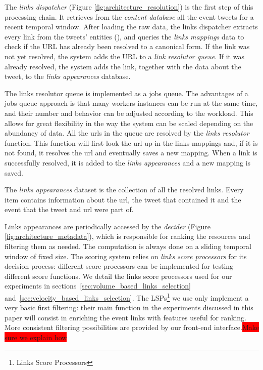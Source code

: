 \documentclass{sig-alternate}
\newcommand{\todo}[1]{\colorbox{red}{#1}}
\begin{document}
The \emph{links dispatcher} (Figure \ref{fig:architecture_resolution}) is the first step of this processing chain. It retrieves from the \emph{content database} all the event tweets for a recent temporal window. After loading the raw data, the links dispatcher extracts every link from the tweets' entities (\cite{RestTweetsDoc}), and queries the \emph{links mappings} data to check if the URL has already been resolved to a canonical form. If the link was not yet resolved, the system adds the URL to a \emph{link resolutor queue}. If it was already resolved, the system adds the link, together with the data about the tweet, to the \emph{links appearances} database. %

The links resolutor queue is implemented as a jobs queue\cite{RedisQueues}. The advantages of a jobs queue approach is that many workers instances can be run at the same time, and their number and behavior can be adjusted according to the workload. This allows for great flexibility in the way the system can be scaled depending on the abundancy of data.
All the urls in the queue are resolved by the \emph{links resolutor} function. This function will first look the url up in the links mappings and, if it is not found, it resolves the url and eventually saves a new mapping. When a link is successfully resolved, it is added to the \emph{links appearances} and a new mapping is saved.

The \emph{links appearances} dataset is the collection of all the resolved links. Every item contains information about the url, the tweet that contained it and the event that the tweet and url were part of. %

Links appearances are periodically accessed by the \emph{decider} (Figure \ref{fig:architecture_metadata}), which is responsible for ranking the resources and filtering them as needed. The computation is always done on a sliding temporal window of fixed size. The scoring system relies on \emph{links score processors} for its decision process: different score processors can be implemented for testing different score functions. We detail the links score processors used for our experiments in sections~\ref{sec:volume_based_links_selection} and~\ref{sec:velocity_based_links_selection}. The LSPs\footnote{Links Score Processors} we use only implement a very basic first filtering: their main function in the experiments discussed in this paper will consist in enriching the event links with features useful for ranking. More consistent filtering possibilities are provided by our front-end interface.\todo{Make sure we explain how}
\end{document}
